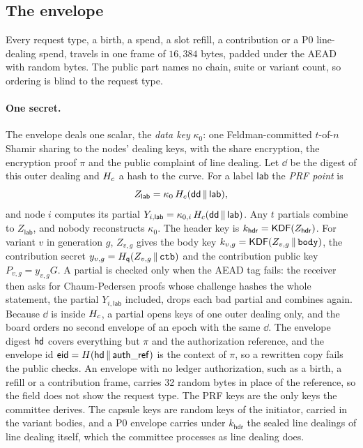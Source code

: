 \subsection{The envelope}\label{sec:envelope}

Every request type, a birth, a spend, a slot refill, a contribution or a P0 line-dealing spend, travels in one frame of $16{,}384$ bytes, padded under the AEAD with random bytes. The public part names no chain, suite or variant count, so ordering is blind to the request type.

\paragraph{One secret.} The envelope deals one scalar, the \emph{data key} $\kappa_0$: one Feldman-committed $t$-of-$n$ Shamir sharing to the nodes' dealing keys, with the share encryption, the encryption proof $\pi$ and the public complaint of line dealing. Let $\dd$ be the digest of this outer dealing and $H_{c}$ a hash to the curve. For a label $\mathsf{lab}$ the \emph{PRF point} is
\[
  Z_{\mathsf{lab}} = \kappa_0 \, H_{c}(\mathsf{dd} \,\|\, \mathsf{lab}),
\]
and node $i$ computes its partial $Y_{i,\mathsf{lab}} = \kappa_{0,i}\,H_{c}(\mathsf{dd} \,\|\, \mathsf{lab})$. Any $t$ partials combine to $Z_{\mathsf{lab}}$, and nobody reconstructs $\kappa_0$. The header key is $k_{\mathsf{hdr}} = \mathsf{KDF}(Z_{\mathsf{hdr}})$. For variant $v$ in generation $g$, $Z_{v,g}$ gives the body key $k_{v,g} = \mathsf{KDF}(Z_{v,g} \,\|\, \texttt{body})$, the contribution secret $y_{v,g} = H_{\mathsf{q}}(Z_{v,g} \,\|\, \texttt{ctb})$ and the contribution public key $P_{v,g} = y_{v,g} G$. A partial is checked only when the AEAD tag fails: the receiver then asks for Chaum-Pedersen proofs whose challenge hashes the whole statement, the partial $Y_{i,\mathsf{lab}}$ included, drops each bad partial and combines again. Because $\dd$ is inside $H_{c}$, a partial opens keys of one outer dealing only, and the board orders no second envelope of an epoch with the same $\dd$. The envelope digest $\mathsf{hd}$ covers everything but $\pi$ and the authorization reference, and the envelope id $\mathsf{eid} = H(\mathsf{hd} \,\|\, \mathsf{auth\_ref})$ is the context of $\pi$, so a rewritten copy fails the public checks. An envelope with no ledger authorization, such as a birth, a refill or a contribution frame, carries 32 random bytes in place of the reference, so the field does not show the request type. The PRF keys are the only keys the committee derives. The capsule keys are random keys of the initiator, carried in the variant bodies, and a P0 envelope carries under $k_{\mathsf{hdr}}$ the sealed line dealings of line dealing itself, which the committee processes as line dealing does.

